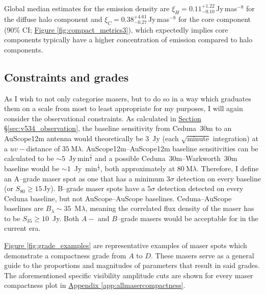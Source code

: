         Global median estimates for the emission density are $\xi_H=0.11^{+1.22}_{-0.10}$\,Jy\,mas$^{-8}$ for the diffuse halo component and $\xi_C=0.38^{+4.61}_{-0.27}$\,Jy\,mas$^{-8}$ for the core component (90\% CI; \hyperref[fig:compact_metrics3]{Figure \ref*{fig:compact_metrics3}}), which expectedly implies core components typically have a higher concentration of emission compared to halo components.
    
         
    \subsection{Constraints and grades}
	    As I wish to not only categorise masers, but to do so in a way which graduates them on a scale from most to least appropriate for my purposes, I will again consider the observational constraints. As calculated in \hyperref[sec:v534_observation]{Section \S\ref*{sec:v534_observation}}, the baseline sensitivity from Ceduna~30m to an AuScope12m antenna would theoretically be 3~Jy (each $\sqrt{\text{minute}}$ integration) at a $uv-$distance of ${35~\text{M}\lambda}$. AuScope12m--AuScope12m baseline sensitivities can be calculated to be $\sim5$~Jy\,min$^{\frac{1}{2}}$ and a possible Ceduna~30m--Warkworth~30m baseline would be $\sim1$~Jy~min$^{\frac{1}{2}}$, both approximately at ${80~\text{M}\lambda}$. Therefore, I define an A--grade maser spot as one that has a minimum $3\sigma$ detection on every baseline (or $S_{80}\ge15$\,Jy). B--grade maser spots have a $5\sigma$ detection detected on every Ceduna baseline, but not AuScope--AuScope baselines. Ceduna--AuScope baselines are $B_\lambda\sim35$~M$\lambda$, meaning the correlated flux density of the maser has to be $S_{35}\ge10$~Jy. Both $A-$ and $B$--grade masers would be acceptable for \spirals\space in the current era.
	    
	    \hyperref[fig:grade_examples]{Figure \ref*{fig:grade_examples}} are representative examples of maser spots which demonstrate a compactness grade from $A$ to $D$. These masers serve as a general guide to the proportions and magnitudes of parameters that result in said grades. The aforementioned specific visibility amplitude cuts are shown for every maser compactness plot in \hyperref[app:allmasercompactness]{Appendix \ref*{app:allmasercompactness}}.
	    
